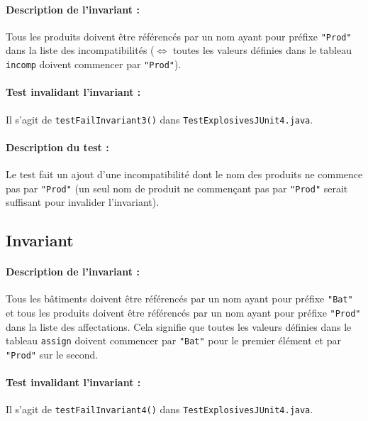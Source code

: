 \documentclass{article}
\begin{document}
\paragraph{Description de l'invariant :} Tous les produits doivent être référencés par un nom ayant pour préfixe \texttt{"Prod"} dans la liste des incompatibilités ($\Leftrightarrow$ toutes les valeurs définies dans le tableau \texttt{incomp} doivent commencer par \texttt{"Prod"}).

\vspace{-0.2cm}
\paragraph{Test invalidant l'invariant :} Il s'agit de \texttt{testFailInvariant3()} dans \texttt{TestExplosivesJUnit4.java}.

\vspace{-0.2cm}
\paragraph{Description du test :} Le test fait un ajout d'une incompatibilité dont le nom des produits ne commence pas par \texttt{"Prod"} (un seul nom de produit ne commençant pas par \texttt{"Prod"} serait suffisant pour invalider l'invariant).

\subsection{Invariant }

\paragraph{Description de l'invariant :} Tous les bâtiments doivent être référencés par un nom ayant pour préfixe \texttt{"Bat"} et tous les produits doivent être référencés par un nom ayant pour préfixe \texttt{"Prod"} dans la liste des affectations. Cela signifie que toutes les valeurs définies dans le tableau \texttt{assign} doivent commencer par \texttt{"Bat"} pour le premier élément et par \texttt{"Prod"} sur le second.

\vspace{-0.2cm}
\paragraph{Test invalidant l'invariant :} Il s'agit de \texttt{testFailInvariant4()} dans \texttt{TestExplosivesJUnit4.java}.
\end{document}
